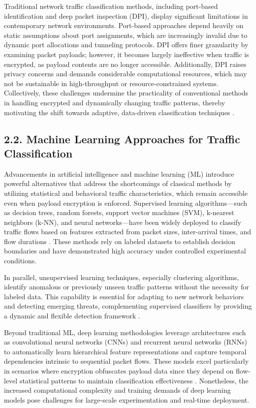 \documentclass[11pt]{article}
\begin{document}
Traditional network traffic classification methods, including port-based identification and deep packet inspection (DPI), display significant limitations in contemporary network environments. Port-based approaches depend heavily on static assumptions about port assignments, which are increasingly invalid due to dynamic port allocations and tunneling protocols. DPI offers finer granularity by examining packet payloads; however, it becomes largely ineffective when traffic is encrypted, as payload contents are no longer accessible. Additionally, DPI raises privacy concerns and demands considerable computational resources, which may not be sustainable in high-throughput or resource-constrained systems. Collectively, these challenges undermine the practicality of conventional methods in handling encrypted and dynamically changing traffic patterns, thereby motivating the shift towards adaptive, data-driven classification techniques \cite{ref51}.

\subsection{2.2. Machine Learning Approaches for Traffic Classification}

Advancements in artificial intelligence and machine learning (ML) introduce powerful alternatives that address the shortcomings of classical methods by utilizing statistical and behavioral traffic characteristics, which remain accessible even when payload encryption is enforced. Supervised learning algorithms—such as decision trees, random forests, support vector machines (SVM), k-nearest neighbors (k-NN), and neural networks—have been widely deployed to classify traffic flows based on features extracted from packet sizes, inter-arrival times, and flow durations \cite{ref51}. These methods rely on labeled datasets to establish decision boundaries and have demonstrated high accuracy under controlled experimental conditions.

In parallel, unsupervised learning techniques, especially clustering algorithms, identify anomalous or previously unseen traffic patterns without the necessity for labeled data. This capability is essential for adapting to new network behaviors and detecting emerging threats, complementing supervised classifiers by providing a dynamic and flexible detection framework \cite{ref51}.

Beyond traditional ML, deep learning methodologies leverage architectures such as convolutional neural networks (CNNs) and recurrent neural networks (RNNs) to automatically learn hierarchical feature representations and capture temporal dependencies intrinsic to sequential packet flows. These models excel particularly in scenarios where encryption obfuscates payload data since they depend on flow-level statistical patterns to maintain classification effectiveness \cite{ref1,ref6,ref51}. Nonetheless, the increased computational complexity and training demands of deep learning models pose challenges for large-scale experimentation and real-time deployment.
\end{document}
